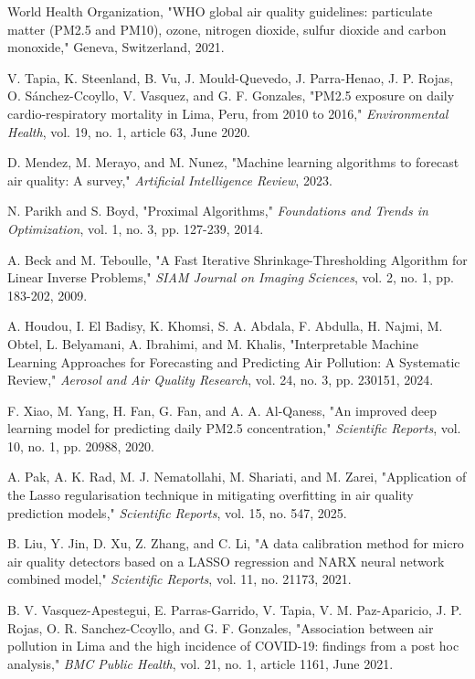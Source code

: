 \documentclass[conference]{IEEEtran}
\begin{document}
\begin{thebibliography}{00}

 World Health Organization, "WHO global air quality guidelines: particulate matter (PM2.5 and PM10), ozone, nitrogen dioxide, sulfur dioxide and carbon monoxide," Geneva, Switzerland, 2021.

 V. Tapia, K. Steenland, B. Vu, J. Mould-Quevedo, J. Parra-Henao, J. P. Rojas, O. Sánchez-Ccoyllo, V. Vasquez, and G. F. Gonzales, "PM2.5 exposure on daily cardio-respiratory mortality in Lima, Peru, from 2010 to 2016," \textit{Environmental Health}, vol. 19, no. 1, article 63, June 2020.

 D. Mendez, M. Merayo, and M. Nunez, "Machine learning algorithms to forecast air quality: A survey," \textit{Artificial Intelligence Review}, 2023.

 N. Parikh and S. Boyd, "Proximal Algorithms," \textit{Foundations and Trends in Optimization}, vol. 1, no. 3, pp. 127-239, 2014.

 A. Beck and M. Teboulle, "A Fast Iterative Shrinkage-Thresholding Algorithm for Linear Inverse Problems," \textit{SIAM Journal on Imaging Sciences}, vol. 2, no. 1, pp. 183-202, 2009.

 A. Houdou, I. El Badisy, K. Khomsi, S. A. Abdala, F. Abdulla, H. Najmi, M. Obtel, L. Belyamani, A. Ibrahimi, and M. Khalis, "Interpretable Machine Learning Approaches for Forecasting and Predicting Air Pollution: A Systematic Review," \textit{Aerosol and Air Quality Research}, vol. 24, no. 3, pp. 230151, 2024.

 F. Xiao, M. Yang, H. Fan, G. Fan, and A. A. Al-Qaness, "An improved deep learning model for predicting daily PM2.5 concentration," \textit{Scientific Reports}, vol. 10, no. 1, pp. 20988, 2020.

 A. Pak, A. K. Rad, M. J. Nematollahi, M. Shariati, and M. Zarei, "Application of the Lasso regularisation technique in mitigating overfitting in air quality prediction models," \textit{Scientific Reports}, vol. 15, no. 547, 2025.

 B. Liu, Y. Jin, D. Xu, Z. Zhang, and C. Li, "A data calibration method for micro air quality detectors based on a LASSO regression and NARX neural network combined model," \textit{Scientific Reports}, vol. 11, no. 21173, 2021.

 B. V. Vasquez-Apestegui, E. Parras-Garrido, V. Tapia, V. M. Paz-Aparicio, J. P. Rojas, O. R. Sanchez-Ccoyllo, and G. F. Gonzales, "Association between air pollution in Lima and the high incidence of COVID-19: findings from a post hoc analysis," \textit{BMC Public Health}, vol. 21, no. 1, article 1161, June 2021.


\end{thebibliography}
\end{document}
